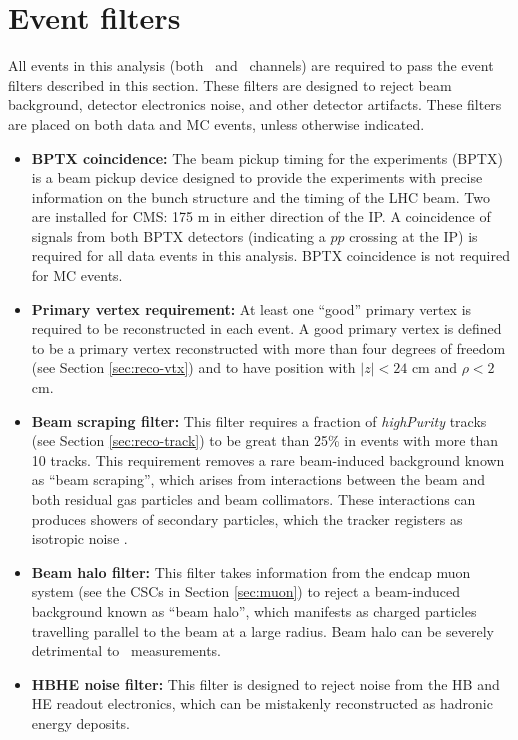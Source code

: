 \section{Event filters}
\label{sec:event-filters}

All events in this analysis (both \eejj~and \enujj~channels)
are required to pass the event filters described in this section.  These filters
are designed to reject beam background, detector electronics
noise, and other detector artifacts.  These filters are placed on both
data and MC events, unless otherwise indicated.

\begin{itemize}
  \item {\bf BPTX coincidence:} The beam pickup timing for the experiments (BPTX)
     is a beam pickup
    device designed to provide the experiments with precise information on the bunch structure
    and the timing of the LHC beam. Two are installed for CMS: 175 m in either direction of the IP.
    A coincidence of signals from both BPTX detectors (indicating a $pp$ crossing at the IP)
    is required for all data events in this analysis.  BPTX coincidence is not required 
    for MC events.
  \item {\bf Primary vertex requirement:} At least one ``good'' primary vertex is 
    required to be reconstructed in each event.  A good primary vertex is defined
    to be a primary vertex reconstructed with more than four degrees of freedom
    (see Section \ref{sec:reco-vtx}) and to have position with $|z| < 24$ cm and 
    $\rho < 2$ cm.
  \item {\bf Beam scraping filter:} This filter requires a fraction of {\it highPurity}
    tracks (see Section \ref{sec:reco-track}) to be great than 25\% in events with more than
    10 tracks.  This requirement removes a rare beam-induced background known as ``beam scraping'',
    which arises from interactions between the beam and both residual gas particles 
    and beam collimators.  These interactions can produces showers of secondary particles, which
    the tracker registers as isotropic noise \cite{cms-jinst}.
  \item {\bf Beam halo filter:} This filter takes information from the endcap muon system
    (see the CSCs in Section \ref{sec:muon}) to reject a beam-induced background known 
    as ``beam halo'', which manifests as charged particles travelling parallel to the beam
    at a large radius.  Beam halo can be severely detrimental to \met~measurements.
  \item {\bf HBHE noise filter:} This filter is designed to reject 
    noise from the HB and HE readout electronics, which can be mistakenly reconstructed
    as hadronic energy deposits.  
\end{itemize}
